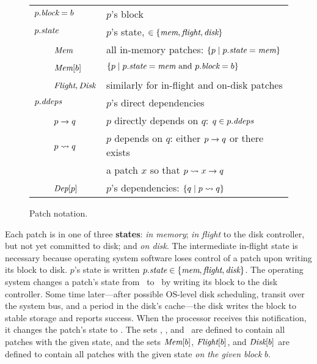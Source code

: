 \begin{figure}
\begin{small}
\begin{tabular}{@{}ll@{}}
$p.\textit{block} = b$ & $p$'s block \\
$p.\textit{state}$ & $p$'s state, $\in \{\textit{mem}, \textit{flight}, \textit{disk}\}$ \\
~~~~$\PMem$ & all in-memory patches: $\{p \mid p.\textit{state} = \textit{mem}\}$ \\
~~~~$\PMem[b]$ & $\{p \mid p.\textit{state} = \textit{mem} \text{ and } p.\textit{block} = b
 \}$ \\
~~~~$\PInf, \PDisk$ & similarly for in-flight and on-disk patches \\
$\PDDepset{p}$ & $p$'s direct dependencies \\
~~~~$p \rightarrow q$ & $p$ directly depends on $q$: $q \in \PDDepset{p}$ \\
~~~~$p \leadsto q$ & $p$ depends on $q$: either $p \rightarrow q$ or there exists \\
       & a patch $x$ so that $p \leadsto x \rightarrow q$ \\
~~~~$\textit{Dep}[p]$ & $p$'s dependencies: $\{ q \mid p \leadsto q \}$ \\
\end{tabular}
\end{small}

\caption{Patch notation.}
\label{fig:patchnot}
\end{figure}


Each patch is in one of three \textbf{states}: \emph{in memory}; \emph{in
 flight} to the disk controller, but not yet committed to disk; and
 \emph{on disk}.  The intermediate in-flight state is necessary because
 operating system software loses control of a patch upon writing its block
 to disk.  $p$'s state is written $p.\textit{state} \in \{\textit{mem}, \textit{flight},
 \textit{disk}\}$.  The operating system changes a patch's state from
 \PMemst\ to \PInfst\ by writing its block to the disk controller.  Some
 time later---after possible OS-level disk scheduling, transit over the
 system bus, and a period in the disk's cache---the disk writes the block
 to stable storage and reports success.  When the processor receives this
 notification, it changes the patch's state to \PDiskst.
%
The sets \PMem, \PInf, and \PDisk\ are defined to contain all patches with
 the given state, and the sets $\PMem[b]$, $\PInf[b]$, and $\PDisk[b]$ are
 defined to contain all patches with the given state \emph{on the given
 block} $b$.

